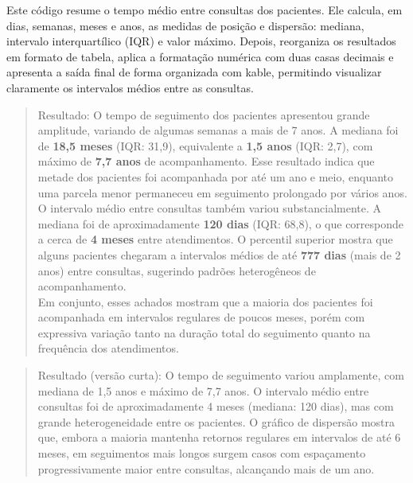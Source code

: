 \documentclass[
]{article}
\begin{document}
Este código resume o tempo médio entre consultas dos pacientes. Ele
calcula, em dias, semanas, meses e anos, as medidas de posição e
dispersão: mediana, intervalo interquartílico (IQR) e valor máximo.
Depois, reorganiza os resultados em formato de tabela, aplica a
formatação numérica com duas casas decimais e apresenta a saída final de
forma organizada com kable, permitindo visualizar claramente os
intervalos médios entre as consultas.

\begin{quote}
Resultado: O tempo de seguimento dos pacientes apresentou grande
amplitude, variando de algumas semanas a mais de 7 anos. A mediana foi
de \textbf{18,5 meses} (IQR: 31,9), equivalente a \textbf{1,5 anos}
(IQR: 2,7), com máximo de \textbf{7,7 anos} de acompanhamento. Esse
resultado indica que metade dos pacientes foi acompanhada por até um ano
e meio, enquanto uma parcela menor permaneceu em seguimento prolongado
por vários anos.\\
O intervalo médio entre consultas também variou substancialmente. A
mediana foi de aproximadamente \textbf{120 dias} (IQR: 68,8), o que
corresponde a cerca de \textbf{4 meses} entre atendimentos. O percentil
superior mostra que alguns pacientes chegaram a intervalos médios de até
\textbf{777 dias} (mais de 2 anos) entre consultas, sugerindo padrões
heterogêneos de acompanhamento.\\
Em conjunto, esses achados mostram que a maioria dos pacientes foi
acompanhada em intervalos regulares de poucos meses, porém com
expressiva variação tanto na duração total do seguimento quanto na
frequência dos atendimentos.
\end{quote}

\begin{quote}
Resultado (versão curta): O tempo de seguimento variou amplamente, com
mediana de 1,5 anos e máximo de 7,7 anos. O intervalo médio entre
consultas foi de aproximadamente 4 meses (mediana: 120 dias), mas com
grande heterogeneidade entre os pacientes. O gráfico de dispersão mostra
que, embora a maioria mantenha retornos regulares em intervalos de até 6
meses, em seguimentos mais longos surgem casos com espaçamento
progressivamente maior entre consultas, alcançando mais de um ano.
\end{quote}
\end{document}

